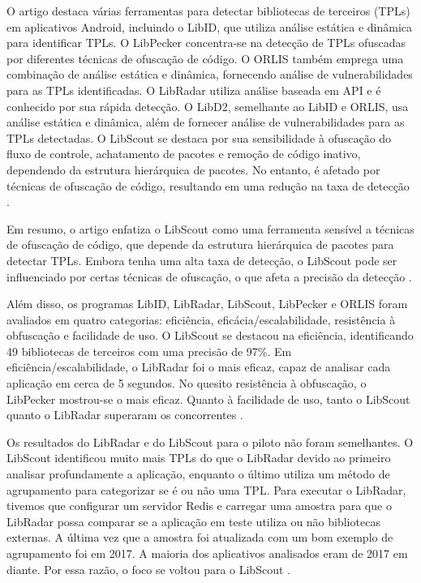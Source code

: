 O artigo destaca várias ferramentas para detectar bibliotecas de terceiros (TPLs) em aplicativos Android, incluindo o LibID, que utiliza análise estática e dinâmica para identificar TPLs. O LibPecker concentra-se na detecção de TPLs ofuscadas por diferentes técnicas de ofuscação de código. O ORLIS também emprega uma combinação de análise estática e dinâmica, fornecendo análise de vulnerabilidades para as TPLs identificadas. O LibRadar utiliza análise baseada em API e é conhecido por sua rápida detecção. O LibD2, semelhante ao LibID e ORLIS, usa análise estática e dinâmica, além de fornecer análise de vulnerabilidades para as TPLs detectadas. O LibScout se destaca por sua sensibilidade à ofuscação do fluxo de controle, achatamento de pacotes e remoção de código inativo, dependendo da estrutura hierárquica de pacotes. No entanto, é afetado por técnicas de ofuscação de código, resultando em uma redução na taxa de detecção \cite{api_tpl_zhang}.

Em resumo, o artigo enfatiza o LibScout como uma ferramenta sensível a técnicas de ofuscação de código, que depende da estrutura hierárquica de pacotes para detectar TPLs. Embora tenha uma alta taxa de detecção, o LibScout pode ser influenciado por certas técnicas de ofuscação, o que afeta a precisão da detecção \cite{api_tpl_zhang}.

Além disso, os programas LibID, LibRadar, LibScout, LibPecker e ORLIS foram avaliados em quatro categorias: eficiência, eficácia/escalabilidade, resistência à obfuscação e facilidade de uso. O LibScout se destacou na eficiência, identificando 49 bibliotecas de terceiros com uma precisão de 97\%. Em eficiência/escalabilidade, o LibRadar foi o mais eficaz, capaz de analisar cada aplicação em cerca de 5 segundos. No quesito resistência à obfuscação, o LibPecker mostrou-se o mais eficaz. Quanto à facilidade de uso, tanto o LibScout quanto o LibRadar superaram os concorrentes \cite{api_tpl_zhang}.

Os resultados do LibRadar e do LibScout para o piloto não foram semelhantes. O LibScout identificou muito mais TPLs do que o LibRadar devido ao primeiro analisar profundamente a aplicação, enquanto o último utiliza um método de agrupamento para categorizar se é ou não uma TPL. Para executar o LibRadar, tivemos que configurar um servidor Redis e carregar uma amostra para que o LibRadar possa comparar se a aplicação em teste utiliza ou não bibliotecas externas. A última vez que a amostra foi atualizada com um bom exemplo de agrupamento foi em 2017. A maioria dos aplicativos analisados eram de 2017 em diante. Por essa razão, o foco se voltou para o LibScout \cite{api_tpl_zhang}.

